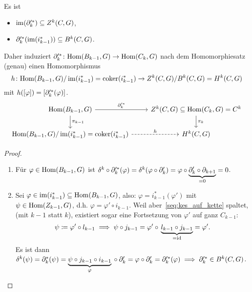 \begin{lemma}
  Es ist
  \begin{itemize}
    \item
      $\operatorname{im}(\partial_k'^*) \subseteq Z^k(C,G)$,
    \item
      $\partial_{k}'^*(\operatorname{im}(i_{k-1}^*)) \subseteq B^k(C,G)$.
  \end{itemize}
  Daher induziert $\partial_k'^*\colon \mathrm{Hom}(B_{k-1},G) \to \mathrm{Hom}(C_k,G)$ nach dem Homomorphiesatz (genau) einen Homomorphismus
  \begin{equation*}
    h \colon \mathrm{Hom}(B_{k-1},G) / \operatorname{im}(i_{k-1}^*) = \operatorname{coker}(i_{k-1}^*) \to Z^k(C,G) / B^k(C,G) = H^k(C,G)
  \end{equation*}
  mit $h([\varphi]) = [\partial_k'^*(\varphi)]$.
  \begin{equation*}
    \begin{tikzcd}
      \Hom(B_{k-1},G) \arrow{r}{\del_k'^*} \arrow{d}{\pi_{k-1}}
      & Z^k(C,G) \subseteq \Hom(C_k,G) = C^k \arrow{d}{\pi_k} \\
      \Hom(B_{k-1},G) / \im(i_{k-1}^*) = \coker(i_{k-1}^*) \arrow[dashed]{r}{h}
      & H^k(C,G)
    \end{tikzcd}
  \end{equation*}
\end{lemma}
\begin{proof}
  \begin{enumerate}
    \item
      Für $\varphi \in \mathrm{Hom}(B_{k-1},G)$ ist $\delta^k \circ \partial_{k}'^*(\varphi) = \delta^k(\varphi \circ \partial_k') = \varphi \circ \underbrace{\partial_k' \circ \partial_{k+1}}_{= 0} = 0$.
    \item
      Sei $\varphi \in \operatorname{im}(i_{k-1}^*) \subseteq  \mathrm{Hom}(B_{k-1},G)$, also: $\varphi = i_{k-1}^*(\varphi')$ mit $\psi \in \mathrm{Hom}(Z_{k-1},G)$, d.h. $\varphi = \varphi' \circ i_{k-1}$.
      Weil aber~\eqref{seq:kes_auf_kette} spaltet, (mit $k-1$ statt $k$), existiert sogar eine Fortsetzung von $\varphi'$ auf ganz $C_{k-1}$:
      \begin{equation*}
        \psi \coloneqq \varphi' \circ l_{k-1} \implies \psi \circ j_{k-1} = \varphi' \circ {} \underbrace{l_{k-1} \circ j_{k-1}}_{= \operatorname{id}} = \varphi'.
      \end{equation*}
      Es ist dann $\delta^k(\psi) = \partial_k^* (\psi) = \underbrace{\psi \circ j_{k-1} \circ i_{k-1}}_{\varphi} {}\circ \partial_k' = \varphi \circ \partial_{k}' = \partial_{k}'^*(\varphi) \implies \partial_{k}'^* \in B^k(C,G)$.
  \end{enumerate}
\end{proof}
